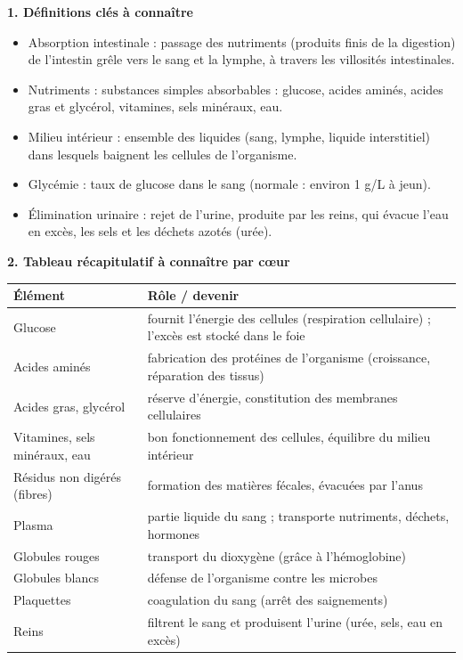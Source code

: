 \documentclass[11pt]{article}
\newcommand{\cle}[1]{{\popxbold\color{popdark}#1}}
\begin{document}
\begin{bilan}
\textbf{1. Définitions clés à connaître}
\begin{itemize}
  \item \cle{Absorption intestinale} : passage des nutriments (produits finis de la digestion) de l'intestin grêle vers le sang et la lymphe, à travers les \cle{villosités intestinales}.
  \item \cle{Nutriments} : substances simples absorbables : glucose, acides aminés, acides gras et glycérol, vitamines, sels minéraux, eau.
  \item \cle{Milieu intérieur} : ensemble des liquides (sang, lymphe, liquide interstitiel) dans lesquels baignent les cellules de l'organisme.
  \item \cle{Glycémie} : taux de glucose dans le sang (normale : environ \num{1} g/L à jeun).
  \item \cle{Élimination urinaire} : rejet de l'urine, produite par les reins, qui évacue l'eau en excès, les sels et les déchets azotés (urée).
\end{itemize}

\textbf{2. Tableau récapitulatif à connaître par cœur}
\begin{center}
\begin{tabularx}{\linewidth}{|l|X|}
\hline
\rowcolor{popblue!40} \textbf{Élément} & \textbf{Rôle / devenir} \\
\hline
Glucose & fournit l'énergie des cellules (respiration cellulaire) ; l'excès est stocké dans le foie \\
\hline
Acides aminés & fabrication des protéines de l'organisme (croissance, réparation des tissus) \\
\hline
Acides gras, glycérol & réserve d'énergie, constitution des membranes cellulaires \\
\hline
Vitamines, sels minéraux, eau & bon fonctionnement des cellules, équilibre du milieu intérieur \\
\hline
Résidus non digérés (fibres) & formation des matières fécales, évacuées par l'anus \\
\hline
Plasma & partie liquide du sang ; transporte nutriments, déchets, hormones \\
\hline
Globules rouges & transport du dioxygène (grâce à l'hémoglobine) \\
\hline
Globules blancs & défense de l'organisme contre les microbes \\
\hline
Plaquettes & coagulation du sang (arrêt des saignements) \\
\hline
Reins & filtrent le sang et produisent l'urine (urée, sels, eau en excès) \\
\hline
\end{tabularx}
\end{center}


\end{bilan}
\end{document}

